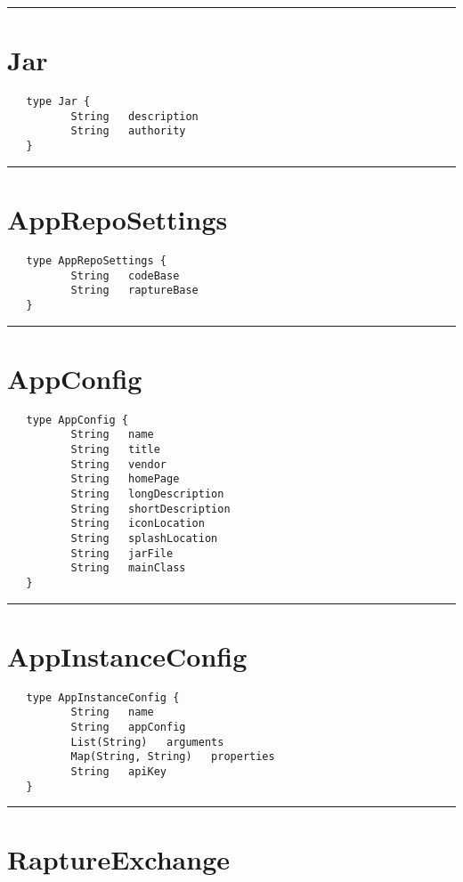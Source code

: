 \rule{12cm}{2pt}
\section{Jar}
\label{type:Jar}

\begin{verbatim}
   type Jar {
          String   description
          String   authority
   }
\end{verbatim}

\rule{12cm}{2pt}
\section{AppRepoSettings}
\label{type:AppRepoSettings}

\begin{verbatim}
   type AppRepoSettings {
          String   codeBase
          String   raptureBase
   }
\end{verbatim}

\rule{12cm}{2pt}
\section{AppConfig}
\label{type:AppConfig}

\begin{verbatim}
   type AppConfig {
          String   name
          String   title
          String   vendor
          String   homePage
          String   longDescription
          String   shortDescription
          String   iconLocation
          String   splashLocation
          String   jarFile
          String   mainClass
   }
\end{verbatim}

\rule{12cm}{2pt}
\section{AppInstanceConfig}
\label{type:AppInstanceConfig}

\begin{verbatim}
   type AppInstanceConfig {
          String   name
          String   appConfig
          List(String)   arguments
          Map(String, String)   properties
          String   apiKey
   }
\end{verbatim}

\rule{12cm}{2pt}
\section{RaptureExchange}
\label{type:RaptureExchange}

